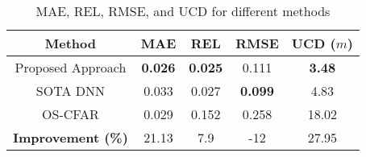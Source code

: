 \renewcommand{\arraystretch}{1.4}
\begin{table}[h]
    \centering
    \begin{tabular}{|c|c|c|c|c|}
        \hline
        \textbf{Method} & \textbf{MAE} & \textbf{REL} & \textbf{RMSE} & \textbf{UCD ($m$)}\\
        \hline\hline
        Proposed Approach  & \textbf{0.026} & \textbf{0.025} & 0.111 & \textbf{3.48} \\
        SOTA DNN         & 0.033 & 0.027 & \textbf{0.099} & 4.83 \\
        OS-CFAR          & 0.029 & 0.152 & 0.258 & 18.02 \\
        \hline\hline
        \textbf{Improvement (\%)} & 21.13 & 7.9 & -12 & 27.95\\
        \hline
    \end{tabular}
    \caption{MAE, REL, RMSE, and UCD for different methods}
    \label{tab:UCD}
    \vspace{-5px}
\end{table}




